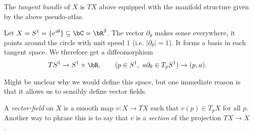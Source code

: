 \begin{defn}\label{defn:tangent-bundle}
	The \emph{tangent bundle} of $X$ is $TX$ above equipped with the manifold structure given by the above pseudo-atlas.
\end{defn}
\begin{example}\label{example:lec2.2}
	Let $X = S^1 = \{e^{i\theta}\} \subseteq \bC = \bR^2$. The vector $\partial_{\theta}$ makes sense everywhere, it points around the circle with unit speed $1$ (i.e. $|\partial_\theta| = 1$). It forms a basis in each tangent space. We therefore get a diffeomorphism
	\begin{align*}
		TS^1 \to S^1 \times \bR, \hspace{2em} (p \in S^1, ~a\partial_\theta \in T_pS^1) \to (p,a).
	\end{align*}
\end{example}
Might be unclear why we would define this space, but one immediate reason is that it allows us to sensibly define vector fields.
\begin{defn}\label{defn:vector-field}
	A \emph{vector-field} on $X$ is a smooth map $v: X \to TX$ such that $v(p) \in T_pX$ for all $p$. Another way to phrase this is to say that $v$ is a \emph{section} of the projection $TX \to X$.
\end{defn}


